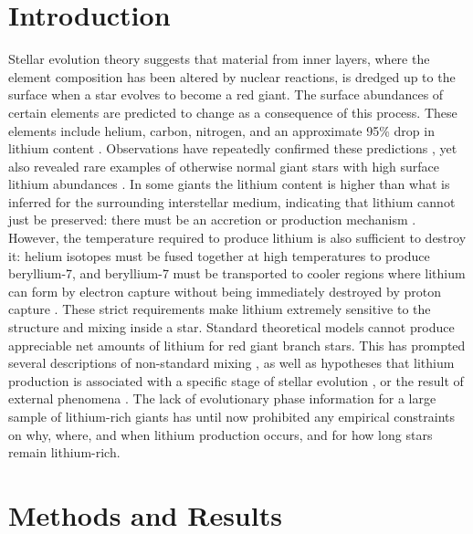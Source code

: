 \documentclass[twocolumn]{aastex62}
\begin{document}
\section{Introduction} \label{sec:intro}
Stellar evolution theory suggests that material from inner layers,
where the element composition has been altered by nuclear reactions, is
dredged up to the surface when a star evolves to become a red giant.
The surface abundances of certain elements are predicted to change as a
consequence of this process. These elements include helium, carbon, nitrogen, and 
an approximate 95\% drop in lithium content \citep{Iben_1967}. Observations have 
repeatedly confirmed these predictions \citep{Lambert_1981,Gilroy_1989,
Kirby_2016}, yet also revealed rare examples of otherwise normal giant stars
with high surface lithium abundances \citep[e.g.,][]{Martell_2013}. In some giants the lithium 
content is higher than what is inferred for the surrounding interstellar medium, indicating that
lithium cannot just be preserved: there must be an accretion or production 
mechanism \citep{Charbonnel_2000}. However, the temperature required to 
produce lithium is also sufficient to destroy it: helium isotopes must be 
fused together at high temperatures to produce beryllium-7, and beryllium-7
must be transported to cooler regions where lithium can form by 
electron capture without being immediately destroyed by proton capture \citep{Cameron_1971}. 
These strict requirements make lithium extremely sensitive to the structure
and mixing inside a star. Standard theoretical models cannot produce
appreciable net amounts of lithium for red giant branch stars. This has prompted several descriptions of
non-standard mixing \citep{Sweigart_1979,Lattanzio_2014,Fekel_1993,Charbonnel_1995,
Sackmann_1999,Charbonnel_2000,Denissenkov_2003}, as well as hypotheses that
lithium production is associated with a specific stage of stellar
evolution \citep{Charbonnel_2000,Kumar_2011,Lattanzio_2014}, or the result 
of external phenomena \citep{Siess_1999,Andrievsky_1999,Denissenkov_2004}. 
The lack of evolutionary phase information for a large sample of
lithium-rich giants has until now prohibited any empirical constraints on why, where, 
and when lithium production occurs, and for how long stars remain lithium-rich.


\section{Methods and Results} \label{sec:methods}
\end{document}

